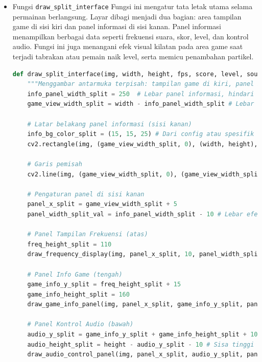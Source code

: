\documentclass[11pt,a4paper]{article}
\begin{document}
\begin{itemize}
\begin{itemize}
\begin{itemize}
\begin{lstlisting}[language=Python, caption=Panel utama dan judul]
    return start_img
# ...existing code...
\end{lstlisting}
\end{itemize}
\item Fungsi \texttt{draw\_split\_interface}
\newline Fungsi ini mengatur tata letak utama selama permainan berlangsung. Layar dibagi menjadi dua bagian: area tampilan game di sisi kiri dan panel informasi di sisi kanan. Panel informasi menampilkan berbagai data seperti frekuensi suara, skor, level, dan kontrol audio. Fungsi ini juga menangani efek visual kilatan pada area game saat terjadi tabrakan atau pemain naik level, serta memicu penambahan partikel.
\begin{lstlisting}[language=Python, caption=Fungsi draw\_split\_interface]
def draw_split_interface(img, width, height, fps, score, level, sound_info, sound_direction, collision_flash, level_up_flash):
    """Menggambar antarmuka terpisah: tampilan game di kiri, panel info di kanan."""
    info_panel_width_split = 250  # Lebar panel informasi, hindari konflik nama
    game_view_width_split = width - info_panel_width_split # Lebar area game
    
    # Latar belakang panel informasi (sisi kanan)
    info_bg_color_split = (15, 15, 25) # Dari config atau spesifik
    cv2.rectangle(img, (game_view_width_split, 0), (width, height), info_bg_color_split, -1)
    
    # Garis pemisah
    cv2.line(img, (game_view_width_split, 0), (game_view_width_split, height), config.color_schemes["primary"], 3)
    
    # Pengaturan panel di sisi kanan
    panel_x_split = game_view_width_split + 5
    panel_width_split_val = info_panel_width_split - 10 # Lebar efektif panel
    
    # Panel Tampilan Frekuensi (atas)
    freq_height_split = 110
    draw_frequency_display(img, panel_x_split, 10, panel_width_split_val, freq_height_split, sound_info)
    
    # Panel Info Game (tengah)
    game_info_y_split = freq_height_split + 15
    game_info_height_split = 160
    draw_game_info_panel(img, panel_x_split, game_info_y_split, panel_width_split_val, game_info_height_split, score, level, fps)
    
    # Panel Kontrol Audio (bawah)
    audio_y_split = game_info_y_split + game_info_height_split + 10
    audio_height_split = height - audio_y_split - 10 # Sisa tinggi untuk panel audio
    draw_audio_control_panel(img, panel_x_split, audio_y_split, panel_width_split_val, audio_height_split, sound_info, sound_direction)
    

\end{lstlisting}
\end{itemize}
\end{itemize}
\end{document}
